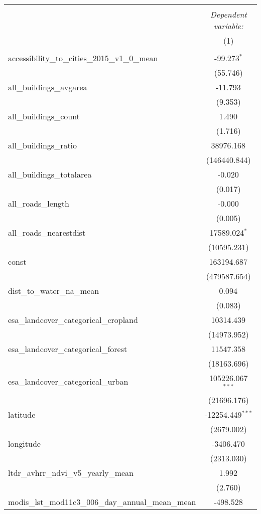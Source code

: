 \begin{table}[!htbp] \centering
\begin{tabular}{@{\extracolsep{5pt}}lc}
\\[-1.8ex]\hline
\hline \\[-1.8ex]
& \multicolumn{1}{c}{\textit{Dependent variable:}} \
\cr \cline{1-2}
\\[-1.8ex] & (1) \\
\hline \\[-1.8ex]
 accessibility_to_cities_2015_v1_0_mean & -99.273$^{*}$ \\
  & (55.746) \\
 all_buildings_avgarea & -11.793$^{}$ \\
  & (9.353) \\
 all_buildings_count & 1.490$^{}$ \\
  & (1.716) \\
 all_buildings_ratio & 38976.168$^{}$ \\
  & (146440.844) \\
 all_buildings_totalarea & -0.020$^{}$ \\
  & (0.017) \\
 all_roads_length & -0.000$^{}$ \\
  & (0.005) \\
 all_roads_nearestdist & 17589.024$^{*}$ \\
  & (10595.231) \\
 const & 163194.687$^{}$ \\
  & (479587.654) \\
 dist_to_water_na_mean & 0.094$^{}$ \\
  & (0.083) \\
 esa_landcover_categorical_cropland & 10314.439$^{}$ \\
  & (14973.952) \\
 esa_landcover_categorical_forest & 11547.358$^{}$ \\
  & (18163.696) \\
 esa_landcover_categorical_urban & 105226.067$^{***}$ \\
  & (21696.176) \\
 latitude & -12254.449$^{***}$ \\
  & (2679.002) \\
 longitude & -3406.470$^{}$ \\
  & (2313.030) \\
 ltdr_avhrr_ndvi_v5_yearly_mean & 1.992$^{}$ \\
  & (2.760) \\
 modis_lst_mod11c3_006_day_annual_mean_mean & -498.528$^{}$ \\

\end{tabular}
\end{table}
